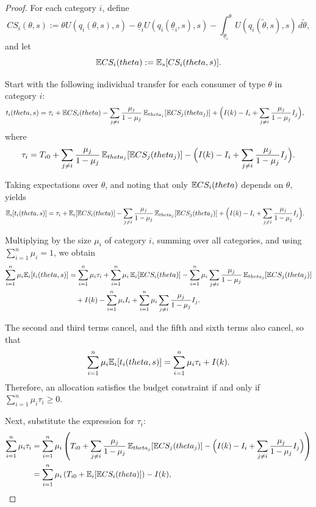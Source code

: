 \documentclass[master.tex]{subfiles}
\begin{document}
\begin{proof}

For each category $i$, define
\[
CS_i(\theta,s)
:=
\theta U\!\left(q_i(\theta,s),s\right)
- \underline\theta_i U\!\left(q_i(\underline\theta_i,s),s\right)
- \int_{\underline{\theta}_i}^{\theta}
U\!\left(q_i(\tilde\theta,s),s\right)\,d\tilde\theta,
\]
and let
\[
\mathbb{E} CS_i(theta)
:=
\mathbb{E}_s[CS_i(theta,s)].
\]

Start with the following individual transfer for each consumer of type $\theta$ in category $i$:
\begin{align*}
t_i(theta,s)
&=
\tau_i
+ \mathbb{E} CS_i(theta)
- \sum_{j\neq i}  \frac{\mu_j}{1-\mu_j}\,
   \mathbb{E}_{theta_j}[\mathbb{E} CS_j(theta_j)] + \Big(I(k) -I_i+\sum_{j\neq i}  \frac{\mu_j}{1-\mu_j}I_j\Big),
\end{align*}
where
\[
\tau_i
=
T_{i0}
+\sum_{j\neq i}  \frac{\mu_j}{1-\mu_j}\,
   \mathbb{E}_{theta_j}[\mathbb{E} CS_j(theta_j)]
- \Big(I(k) -I_i+\sum_{j\neq i}  \frac{\mu_j}{1-\mu_j}I_j\Big).
\]

Taking expectations over $\theta$, and noting that only $\mathbb{E} CS_i(theta)$ depends on $\theta$, yields
\begin{align*}
\mathbb{E}_i[t_i(theta,s)]
&=
\tau_i
+ \mathbb{E}_i[\mathbb{E} CS_i(theta)]
- \sum_{j\neq i}  \frac{\mu_j}{1-\mu_j}\,
   \mathbb{E}_{theta_j}[\mathbb{E} CS_j(theta_j)] 
+ \Big(I(k) -I_i+\sum_{j\neq i}  \frac{\mu_j}{1-\mu_j}I_j\Big).
\end{align*}

Multiplying by the size $\mu_i$ of category $i$, summing over all categories, and using $\sum_{i=1}^n\mu_i = 1$, we obtain
\begin{align*}
\sum_{i=1}^n \mu_i\mathbb{E}_i[t_i(theta,s)]
&=
\sum_{i=1}^n \mu_i \tau_i
+ \sum_{i=1}^n\mu_i\,\mathbb{E}_i[\mathbb{E} CS_i(theta)]-\sum_{i=1}^n\mu_i\sum_{j\neq i} \frac{\mu_j}{1-\mu_j}\,
   \mathbb{E}_{theta_j}[\mathbb{E} CS_j(theta_j)]
\\
&\quad
+ I(k)
-\sum_{i=1}^n\mu_iI_i
+\sum_{i=1}^n\mu_i\sum_{j\neq i}  \frac{\mu_j}{1-\mu_j}I_j.
\end{align*}

The second and third terms cancel, and the fifth and sixth terms also cancel, so that
\[
\sum_{i=1}^n \mu_i\mathbb{E}_i[t_i(theta,s)]
=
\sum_{i=1}^n \mu_i \tau_i + I(k).
\]
Therefore, an allocation satisfies the budget constraint if and only if $\sum_{i=1}^n \mu_i \tau_i \geq 0$.

Next, substitute the expression for $\tau_i$:
\begin{align*}
\sum_{i=1}^n \mu_i \tau_i &= \sum_{i=1}^n \mu_i \left( T_{i0} + \sum_{j\neq i} \frac{\mu_j}{1-\mu_j}\, \mathbb{E}_{theta_j}[\mathbb{E} CS_j(theta_j)] - \Big(I(k) - I_i + \sum_{j\neq i} \frac{\mu_j}{1-\mu_j} I_j\Big) \right) \\
&= \sum_{i=1}^n \mu_i \left( T_{i0} + \mathbb{E}_i[\mathbb{E} CS_i(theta)] \right) - I(k),
\end{align*}


\end{proof}
\end{document}
